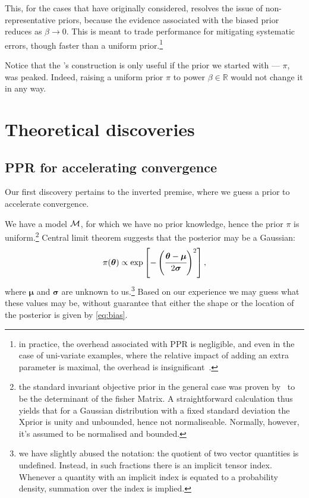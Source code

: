 \documentclass[usenatbib]{mnras}
\begin{document}
This, for the cases that \citeauthor{chen-ferroz-hobson} have
originally considered, resolves the issue of non-representative
priors, because the evidence associated with the biased prior reduces
as \(\beta\rightarrow0\). This is meant to trade performance for
mitigating systematic errors, though faster than a uniform
prior.\footnote{in practice, the overhead associated with PPR is
  negligible, and even in the case of uni-variate examples, where the
  relative impact of adding an extra parameter is maximal, the
  overhead is insignificant~\cite[see][section ``numerical
  examples'']{chen-ferroz-hobson}.}

Notice that the \citeauthor{chen-ferroz-hobson}'s construction is
only useful if the prior we started with --- \(\pi\), was
peaked. Indeed, raising a uniform prior \(\pi\) to power \(\beta \in
   \mathbb{R}\) would not change it in any way.

\section{Theoretical discoveries}
\subsection{PPR for  accelerating convergence}

Our first discovery pertains to the inverted premise, where we guess a
prior to accelerate convergence.

We have a model \({\cal M}\), for which we have no prior knowledge,
hence the prior \(\pi\) is uniform.\footnote{the standard invariant
  objective prior in the general case was proven
  by~\cite{JeffreysPrior} to be the determinant of the fisher
  Matrix. A straightforward calculation thus yields that for a
  Gaussian distribution with a fixed standard deviation the Xprior is
  unity and unbounded, hence not normaliseable. Normally, however,
  it's assumed to be normalised and bounded.} Central limit theorem
suggests that the posterior may be a Gaussian:
\begin{equation}
 \pi (\bm{\theta}) \propto \exp \left[-\left(\cfrac{\bm{\theta} - \bm{\mu}}{2\bm{\sigma}}\right)^{2} \right],
 \label{eq:bias}
\end{equation}
where \(\bm{\mu}\) and \(\bm{\sigma}\) are unknown to us.\footnote{we
  have slightly abused the notation: the quotient of two vector
  quantities is undefined. Instead, in such fractions there is an
  implicit tensor index. Whenever a quantity with an implicit index is
  equated to a probability density, summation over the index is
  implied.} Based on our experience we may guess what these values may
be, without guarantee that either the shape or the location of the
posterior is given by \cref{eq:bias}.
\end{document}

